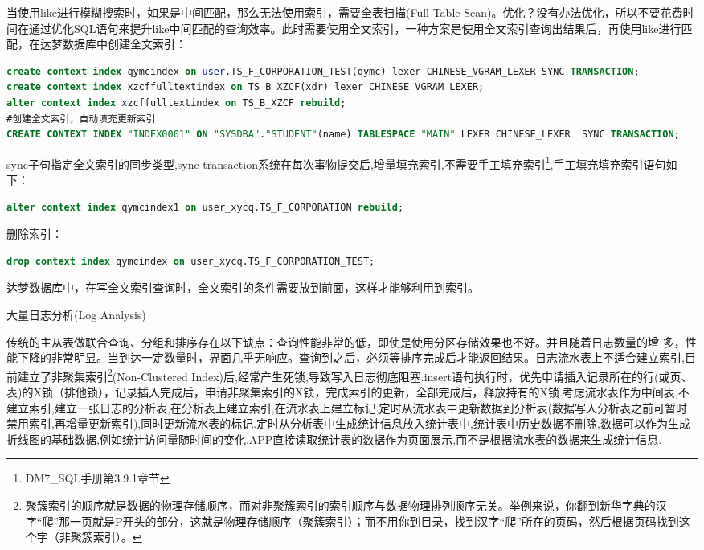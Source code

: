 \documentclass[12pt]{book}
\makeatletter
\numberwithin{dummy}{section}
\theoremstyle{ocrenumbox}
\theoremstyle{blacknumex}
\theoremstyle{blacknumbox}
\theoremstyle{ocrenum}
\renewcommand{\subsection}{\@startsection {subsection}{2}{\z@}
	{-3ex \@plus -0.1ex \@minus -.4ex}
	{0.5ex \@plus.2ex }
	{\normalfont\sffamily\bfseries}}
\makeatother
\begin{document}
当使用like进行模糊搜索时，如果是中间匹配，那么无法使用索引，需要全表扫描(Full Table Scan)。优化？没有办法优化，所以不要花费时间在通过优化SQL语句来提升like中间匹配的查询效率。此时需要使用全文索引，一种方案是使用全文索引查询出结果后，再使用like进行匹配，在达梦数据库中创建全文索引：

\begin{lstlisting}[language=SQL]
create context index qymcindex on user.TS_F_CORPORATION_TEST(qymc) lexer CHINESE_VGRAM_LEXER SYNC TRANSACTION;
create context index xzcffulltextindex on TS_B_XZCF(xdr) lexer CHINESE_VGRAM_LEXER;
alter context index xzcffulltextindex on TS_B_XZCF rebuild;
#创建全文索引，自动填充更新索引
CREATE CONTEXT INDEX "INDEX0001" ON "SYSDBA"."STUDENT"(name) TABLESPACE "MAIN" LEXER CHINESE_LEXER  SYNC TRANSACTION;
\end{lstlisting}

sync子句指定全文索引的同步类型,sync transaction系统在每次事物提交后,增量填充索引,不需要手工填充索引\footnote{DM7\_SQL手册第3.9.1章节},手工填充填充索引语句如下：

\begin{lstlisting}[language=SQL]
alter context index qymcindex1 on user_xycq.TS_F_CORPORATION rebuild;
\end{lstlisting}

删除索引：

\begin{lstlisting}[language=SQL]
drop context index qymcindex on user_xycq.TS_F_CORPORATION_TEST;
\end{lstlisting}

达梦数据库中，在写全文索引查询时，全文索引的条件需要放到前面，这样才能够利用到索引。

\subsection{大量日志分析(Log Analysis)}

传统的主从表做联合查询、分组和排序存在以下缺点：查询性能非常的低，即使是使用分区存储效果也不好。并且随着日志数量的增 多，性能下降的非常明显。当到达一定数量时，界面几乎无响应。查询到之后，必须等排序完成后才能返回结果。日志流水表上不适合建立索引,目前建立了非聚集索引\footnote{聚簇索引的顺序就是数据的物理存储顺序，而对非聚簇索引的索引顺序与数据物理排列顺序无关。举例来说，你翻到新华字典的汉字“爬”那一页就是P开头的部分，这就是物理存储顺序（聚簇索引）；而不用你到目录，找到汉字“爬”所在的页码，然后根据页码找到这个字（非聚簇索引）。}(Non-Clustered Index)后,经常产生死锁,导致写入日志彻底阻塞.insert语句执行时，优先申请插入记录所在的行(或页、表)的X锁（排他锁），记录插入完成后，申请非聚集索引的X锁，完成索引的更新，全部完成后，释放持有的X锁.考虑流水表作为中间表,不建立索引,建立一张日志的分析表,在分析表上建立索引,在流水表上建立标记,定时从流水表中更新数据到分析表(数据写入分析表之前可暂时禁用索引,再增量更新索引),同时更新流水表的标记.定时从分析表中生成统计信息放入统计表中,统计表中历史数据不删除,数据可以作为生成折线图的基础数据,例如统计访问量随时间的变化.APP直接读取统计表的数据作为页面展示,而不是根据流水表的数据来生成统计信息.
\end{document}
